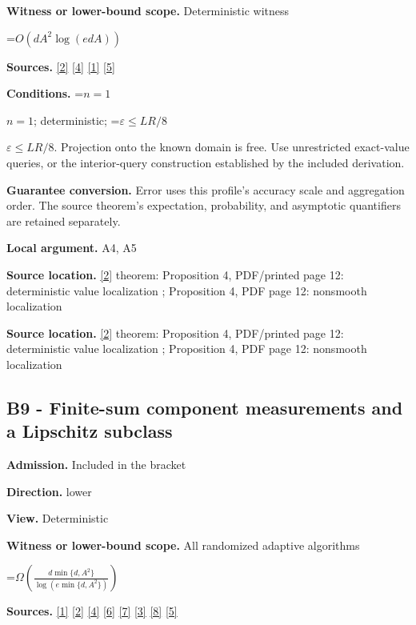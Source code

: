 \documentclass[10pt,a4paper]{article}
\newcommand{\AtlasMath}[1]{\par\begingroup\centering\setbox0=\hbox{$\displaystyle #1$}\ifdim\wd0>1.4\linewidth\typeout{ATLAS WIDE FORMULA: \the\wd0}\fi\ifdim\wd0>\linewidth\resizebox{\linewidth}{!}{\box0}\else\box0\fi\par\endgroup}
\newcommand{\AtlasInlineMath}[1]{\begingroup\setbox0=\hbox{$#1$}\ifdim\wd0>.4\linewidth\endgroup\AtlasMath{#1}\else\endgroup$#1$\fi}
\begin{document}
\textbf{Witness or lower-bound scope.} Deterministic witness

\AtlasMath{O\!\left(dA^2\log(edA)\right)}
\textbf{Sources.} \href{https://arxiv.org/html/2607.16558v2}{[2]} \href{https://www.mathnet.ru/php/archive.phtml?jrnid=mzm&option_lang=eng&paperid=1697&wshow=paper}{[4]} \href{https://arxiv.org/html/2610.00345v1}{[1]} \href{https://arxiv.org/abs/2109.08858}{[5]}

\textbf{Conditions.} \AtlasInlineMath{n=1}; deterministic; \AtlasInlineMath{\varepsilon\le LR/8}. Projection onto the known domain is free. Use unrestricted exact-value queries, or the interior-query construction established by the included derivation.

\textbf{Guarantee conversion.} Error uses this profile's accuracy scale and aggregation order. The source theorem's expectation, probability, and asymptotic quantifiers are retained separately.

\textbf{Local argument.} A4, A5

\textbf{Source location.} \href{https://arxiv.org/html/2607.16558v2}{[2]} theorem: Proposition 4, PDF/printed page 12: deterministic value localization ; Proposition 4, PDF page 12: nonsmooth localization

\textbf{Source location.} \href{https://arxiv.org/html/2607.16558v2}{[2]} theorem: Proposition 4, PDF/printed page 12: deterministic value localization ; Proposition 4, PDF page 12: nonsmooth localization

\subsection{B9 - Finite-sum component measurements and a Lipschitz subclass}
\textbf{Admission.} Included in the bracket

\textbf{Direction.} lower

\textbf{View.} Deterministic

\textbf{Witness or lower-bound scope.} All randomized adaptive algorithms

\AtlasMath{\Omega\!\left(\frac{d\min\{d,A^2\}}{\log(e\min\{d,A^2\})}\right)}
\textbf{Sources.} \href{https://arxiv.org/html/2610.00345v1}{[1]} \href{https://arxiv.org/html/2607.16558v2}{[2]} \href{https://www.mathnet.ru/php/archive.phtml?jrnid=mzm&option_lang=eng&paperid=1697&wshow=paper}{[4]} \href{https://arxiv.org/abs/1802.09022}{[6]} \href{https://proceedings.neurips.cc/paper_files/paper/2022/file/329ef22fd8cb68223d5df09a037f7dd9-Paper-Conference.pdf}{[7]} \href{https://jmlr.org/papers/volume18/16-632/16-632.pdf}{[3]} \href{https://arxiv.org/pdf/1707.08486v2}{[8]} \href{https://arxiv.org/abs/2109.08858}{[5]}
\end{document}
